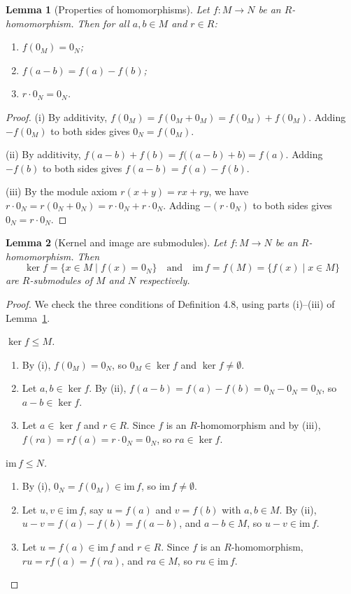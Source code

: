\documentclass[12pt]{article}
\newtheorem{lemma}{Lemma}
\begin{document}
\begin{lemma}[Properties of homomorphisms]\label{lem:hom-basic}
Let $f \colon M \to N$ be an $R$-homomorphism. Then for all $a, b \in M$ and $r \in R$:
\begin{enumerate}[label=(\roman*)]
  \item $f(0_M) = 0_N$;
  \item $f(a - b) = f(a) - f(b)$;
  \item $r \cdot 0_N = 0_N$.
\end{enumerate}
\end{lemma}

\begin{proof}
(i) By additivity, $f(0_M) = f(0_M + 0_M) = f(0_M) + f(0_M)$. Adding $-f(0_M)$ to both sides gives $0_N = f(0_M)$.

(ii) By additivity, $f(a - b) + f(b) = f\bigl((a - b) + b\bigr) = f(a)$. Adding $-f(b)$ to both sides gives $f(a - b) = f(a) - f(b)$.

(iii) By the module axiom $r(x + y) = rx + ry$, we have $r \cdot 0_N = r(0_N + 0_N) = r \cdot 0_N + r \cdot 0_N$. Adding $-(r \cdot 0_N)$ to both sides gives $0_N = r \cdot 0_N$.
\end{proof}

\begin{lemma}[Kernel and image are submodules]\label{lem:ker-im}
Let $f \colon M \to N$ be an $R$-homomorphism. Then
\[
  \ker f = \{x \in M \mid f(x) = 0_N\} \quad \text{and} \quad \mathrm{im}\, f = f(M) = \{f(x) \mid x \in M\}
\]
are $R$-submodules of $M$ and $N$ respectively.
\end{lemma}

\begin{proof}
We check the three conditions of Definition 4.8, using parts (i)--(iii) of Lemma~\ref{lem:hom-basic}.

\textit{$\ker f \leq M$.}
\begin{enumerate}[label=(\roman*)]
  \item By (i), $f(0_M) = 0_N$, so $0_M \in \ker f$ and $\ker f \neq \emptyset$.
  \item Let $a, b \in \ker f$. By (ii), $f(a - b) = f(a) - f(b) = 0_N - 0_N = 0_N$, so $a - b \in \ker f$.
  \item Let $a \in \ker f$ and $r \in R$. Since $f$ is an $R$-homomorphism and by (iii), $f(ra) = rf(a) = r \cdot 0_N = 0_N$, so $ra \in \ker f$.
\end{enumerate}

\textit{$\mathrm{im}\, f \leq N$.}
\begin{enumerate}[label=(\roman*)]
  \item By (i), $0_N = f(0_M) \in \mathrm{im}\, f$, so $\mathrm{im}\, f \neq \emptyset$.
  \item Let $u, v \in \mathrm{im}\, f$, say $u = f(a)$ and $v = f(b)$ with $a, b \in M$. By (ii), $u - v = f(a) - f(b) = f(a - b)$, and $a - b \in M$, so $u - v \in \mathrm{im}\, f$.
  \item Let $u = f(a) \in \mathrm{im}\, f$ and $r \in R$. Since $f$ is an $R$-homomorphism, $ru = rf(a) = f(ra)$, and $ra \in M$, so $ru \in \mathrm{im}\, f$. \qedhere
\end{enumerate}
\end{proof}
\end{document}
